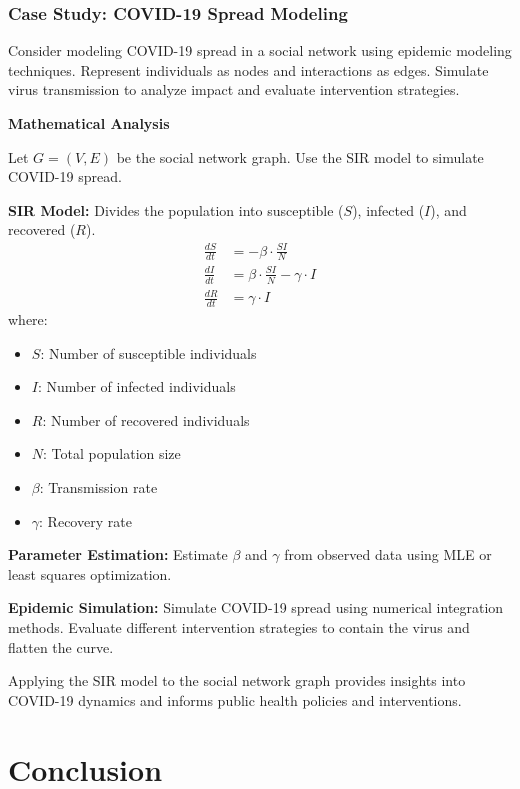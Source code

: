 \documentclass[12pt]{book} %
\begin{document}
\subsubsection{Case Study: COVID-19 Spread Modeling}

Consider modeling COVID-19 spread in a social network using epidemic modeling techniques. Represent individuals as nodes and interactions as edges. Simulate virus transmission to analyze impact and evaluate intervention strategies.

\textbf{Mathematical Analysis}

Let \(G = (V, E)\) be the social network graph. Use the SIR model to simulate COVID-19 spread.

\textbf{SIR Model:} Divides the population into susceptible (\(S\)), infected (\(I\)), and recovered (\(R\)).
\[
\begin{aligned}
\frac{dS}{dt} &= -\beta \cdot \frac{SI}{N} \\
\frac{dI}{dt} &= \beta \cdot \frac{SI}{N} - \gamma \cdot I \\
\frac{dR}{dt} &= \gamma \cdot I
\end{aligned}
\]
where:
\begin{itemize}
    \item \(S\): Number of susceptible individuals
    \item \(I\): Number of infected individuals
    \item \(R\): Number of recovered individuals
    \item \(N\): Total population size
    \item \(\beta\): Transmission rate
    \item \(\gamma\): Recovery rate
\end{itemize}

\textbf{Parameter Estimation:} Estimate \(\beta\) and \(\gamma\) from observed data using MLE or least squares optimization.

\textbf{Epidemic Simulation:} Simulate COVID-19 spread using numerical integration methods. Evaluate different intervention strategies to contain the virus and flatten the curve.

Applying the SIR model to the social network graph provides insights into COVID-19 dynamics and informs public health policies and interventions.


\section{Conclusion}
\end{document}
